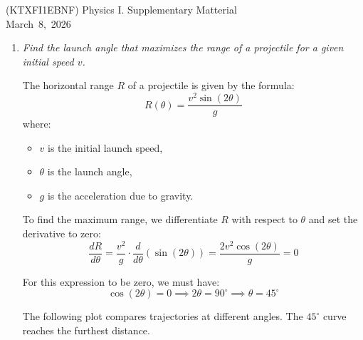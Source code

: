 \documentclass[a4paper,12pt]{letter}
\begin{document}
\begin{center}
 (KTXFI1EBNF) Physics I.  Supplementary Matterial\\ \smallskip
March~8,~2026
 \end{center}

\begin{enumerate}

\item \textit{Find the launch angle that maximizes the range of a projectile for a given initial speed $v$.}

\medskip
  
The horizontal range $R$ of a projectile is given by the formula:
\begin{equation}
    R(\theta) = \frac{v^2 \sin(2\theta)}{g}
\end{equation}
where:
\begin{itemize}
    \item $v$ is the initial launch speed,
    \item $\theta$ is the launch angle,
    \item $g$ is the acceleration due to gravity.
\end{itemize}

To find the maximum range, we differentiate $R$ with respect to $\theta$ and set the derivative to zero:
\begin{equation}
    \frac{dR}{d\theta} = \frac{v^2}{g} \cdot \frac{d}{d\theta}(\sin(2\theta)) = \frac{2v^2 \cos(2\theta)}{g} = 0
\end{equation}

For this expression to be zero, we must have:
\begin{equation}
    \cos(2\theta) = 0 \implies 2\theta = 90^\circ \implies \theta = 45^\circ
\end{equation}

The following plot compares trajectories at different angles. The $45^\circ$ curve reaches the furthest distance.

\begin{center}
\end{center}
\end{enumerate}
\end{document}
